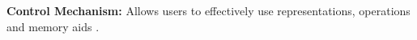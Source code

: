 \textbf{Control Mechanism: }Allows users to effectively use representations, operations and memory aids \cite{DSS}.\\
